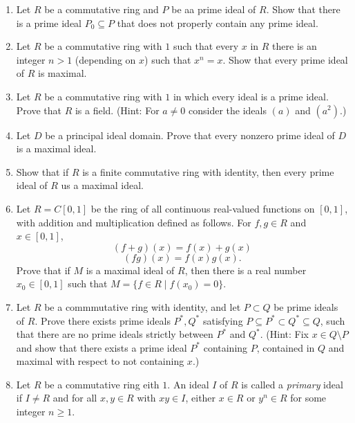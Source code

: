 \documentclass{article}
\theoremstyle{definition}
\begin{document}
\begin{enumerate}
            \item Let $R$ be a commutative ring and $P$ be aa prime ideal of $R$. Show that there is a prime ideal $P_0\subseteq P$ that does not properly contain any prime ideal.
            
            \item Let $R$ be a commutative ring with $1$ such that every $x$ in $R$ there is an integer $n>1$ (depending on $x$) such that $x^n=x$. Show that every prime ideal of $R$ is maximal.
            
            \item Let $R$ be a commutative ring with $1$ in which every ideal is a prime ideal. Prove that $R$ is a field. (Hint: For $a\neq 0$ consider the ideals $(a)$ and $(a^2)$.)
            
            \item Let $D$ be a principal ideal domain. Prove that every nonzero prime ideal of $D$ is a maximal ideal. 
            
            \item Show that if $R$ is a finite commutative ring with identity, then every prime ideal of $R$ us a maximal ideal.
            
            \item Let $R=C[0,1]$ be the ring of all continuous real-valued functions on $[0,1]$, with addition and multiplication defined as follows. For $f,g\in R$ and $x\in [0,1]$, \[(f+g)(x)=f(x)+g(x)\] \[(fg)(x)=f(x)g(x).\] Prove that if $M$ is a maximal ideal of $R$, then there is a real number $x_0\in [0,1]$ such that $M=\{f\in R \mid  f(x_0)=0\}$.
            
            \item Let $R$ be a commmutative ring with identity, and let $P\subset Q$ be prime ideals of $R$. Prove there exists prime ideals $P^*, Q^*$ satisfying $P\subseteq P^* \subset Q^* \subseteq Q$, such that there are no prime ideals strictly between $P^*$ and $Q^*$. (Hint: Fix $x\in Q \setminus P$ and show that there exists a prime ideal $P^*$ containing $P$, contained in $Q$ and maximal with respect to not containing $x$.)
        
            \item Let $R$ be a commutative ring eith $1$. An ideal $I$ of $R$ is called a \textit{primary} ideal if $I\neq R$ and for all $x,y\in R$ with $xy\in I$, either $x\in R$ or $y^n\in R$ for some integer $n \geq 1$.
            

\end{enumerate}
\end{document}

